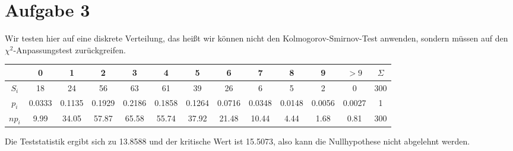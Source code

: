 \documentclass{article}
\begin{document}
	\section*{Aufgabe 3}
	Wir testen hier auf eine diskrete Verteilung, das heißt wir können nicht den Kolmogorov-Smirnov-Test anwenden, sondern müssen auf den $\chi^2$-Anpassungstest zurückgreifen.
	\begin{center}
		\begin{tabular}{c|ccccccccccc|c}
			 & 0 & 1 & 2 & 3 & 4 & 5 & 6 & 7 & 8 & 9 & $>9$ & $\Sigma$ \\
			 \hline
			$S_i$ & 18 & 24 & 56 & 63 & 61 & 39 & 26 & 6 & 5 & 2 & 0 & 300 \\
			$p_i$ & 0.0333 & 0.1135 & 0.1929 & 0.2186 & 0.1858 & 0.1264 & 0.0716 & 0.0348 & 0.0148 & 0.0056 & 0.0027 & 1 \\
			$np_i$ & 9.99
& 34.05
& 57.87
& 65.58
& 55.74
& 37.92
& 21.48
& 10.44
& 4.44
& 1.68
& 0.81 & 300
		\end{tabular}
	\end{center}
	Die Teststatistik ergibt sich zu 13.8588 und der kritische Wert ist 15.5073, also kann die Nullhypothese nicht abgelehnt werden.
\end{document}
